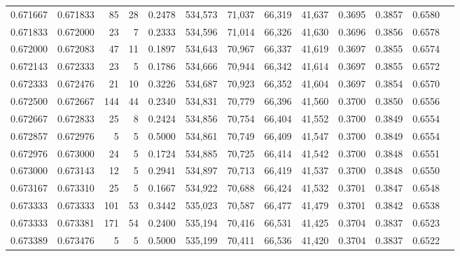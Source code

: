 \begin{tabular}{rrrrrrrrrrrrr}
0.671667 & 0.671833 &    85 &  28 &                                     0.2478 & 534,573 &  71,037 &  66,319 &  41,637 & 0.3695 & 0.3857 & 0.6580 \\
0.671833 & 0.672000 &    23 &   7 &                                     0.2333 & 534,596 &  71,014 &  66,326 &  41,630 & 0.3696 & 0.3856 & 0.6578 \\
0.672000 & 0.672083 &    47 &  11 &                                     0.1897 & 534,643 &  70,967 &  66,337 &  41,619 & 0.3697 & 0.3855 & 0.6574 \\
0.672143 & 0.672333 &    23 &   5 &                                     0.1786 & 534,666 &  70,944 &  66,342 &  41,614 & 0.3697 & 0.3855 & 0.6572 \\
0.672333 & 0.672476 &    21 &  10 &                                     0.3226 & 534,687 &  70,923 &  66,352 &  41,604 & 0.3697 & 0.3854 & 0.6570 \\
0.672500 & 0.672667 &   144 &  44 &                                     0.2340 & 534,831 &  70,779 &  66,396 &  41,560 & 0.3700 & 0.3850 & 0.6556 \\
0.672667 & 0.672833 &    25 &   8 &                                     0.2424 & 534,856 &  70,754 &  66,404 &  41,552 & 0.3700 & 0.3849 & 0.6554 \\
0.672857 & 0.672976 &     5 &   5 &                                     0.5000 & 534,861 &  70,749 &  66,409 &  41,547 & 0.3700 & 0.3849 & 0.6554 \\
0.672976 & 0.673000 &    24 &   5 &                                     0.1724 & 534,885 &  70,725 &  66,414 &  41,542 & 0.3700 & 0.3848 & 0.6551 \\
0.673000 & 0.673143 &    12 &   5 &                                     0.2941 & 534,897 &  70,713 &  66,419 &  41,537 & 0.3700 & 0.3848 & 0.6550 \\
0.673167 & 0.673310 &    25 &   5 &                                     0.1667 & 534,922 &  70,688 &  66,424 &  41,532 & 0.3701 & 0.3847 & 0.6548 \\
0.673333 & 0.673333 &   101 &  53 &                                     0.3442 & 535,023 &  70,587 &  66,477 &  41,479 & 0.3701 & 0.3842 & 0.6538 \\
0.673333 & 0.673381 &   171 &  54 &                                     0.2400 & 535,194 &  70,416 &  66,531 &  41,425 & 0.3704 & 0.3837 & 0.6523 \\
0.673389 & 0.673476 &     5 &   5 &                                     0.5000 & 535,199 &  70,411 &  66,536 &  41,420 & 0.3704 & 0.3837 & 0.6522 \\

\end{tabular}
